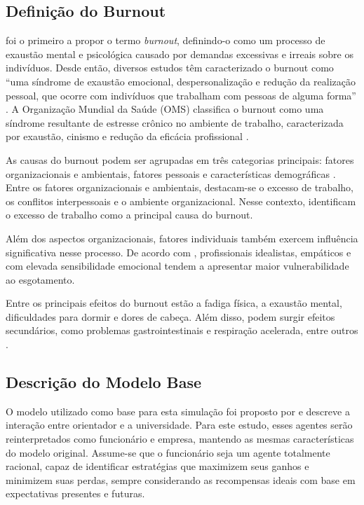 \documentclass[
	article,			%
	11pt,				%
	oneside,			%
	a4paper,			%
	english,			%
	brazil,				%
	sumario=tradicional
	]{abntex2}
\begin{document}
\subsection{Definição do Burnout}
\begin{sloppypar}
 foi o primeiro a propor o termo \textit{burnout}, definindo-o como um processo de exaustão mental e psicológica causado por demandas excessivas e irreais sobre os indivíduos. 
Desde então, diversos estudos têm caracterizado o burnout como ``uma síndrome de exaustão emocional, despersonalização e redução da realização pessoal, que ocorre com indivíduos que trabalham com pessoas de alguma forma'' \cite{maslach2001burnout, cordes1993review, benson2002burnout}. 
A Organização Mundial da Saúde (OMS) classifica o burnout como uma síndrome resultante de estresse crônico no ambiente de trabalho, caracterizada por exaustão, cinismo e redução da eficácia profissional \cite{Downey2023}.

As causas do burnout podem ser agrupadas em três categorias principais: fatores organizacionais e ambientais, fatores pessoais e características demográficas \cite{maslach2001burnout, benson2002burnout}. Entre os fatores organizacionais e ambientais, destacam-se o excesso de trabalho, os conflitos interpessoais e o ambiente organizacional. 
Nesse contexto,  identificam o excesso de trabalho como a principal causa do burnout.

Além dos aspectos organizacionais, fatores individuais também exercem influência significativa nesse processo. De acordo com , profissionais idealistas, empáticos e com elevada sensibilidade emocional tendem a apresentar maior vulnerabilidade ao esgotamento.

Entre os principais efeitos do burnout estão a fadiga física, a exaustão mental, dificuldades para dormir e dores de cabeça. Além disso, podem surgir efeitos secundários, como problemas gastrointestinais e respiração acelerada, entre outros \cite{burke1996stress, freudenberger1974staff, benson2002burnout}.
\end{sloppypar}

\subsection{Descrição do Modelo Base}
O modelo utilizado como base para esta simulação foi proposto por \cite{Zhang2020Burnout} e descreve a interação entre orientador e a universidade. Para este estudo, esses agentes serão reinterpretados como funcionário e empresa, mantendo as mesmas características do modelo original. Assume-se que o funcionário seja um agente totalmente racional, capaz de identificar estratégias que maximizem seus ganhos e minimizem suas perdas, sempre considerando as recompensas ideais com base em expectativas presentes e futuras.
\end{document}
